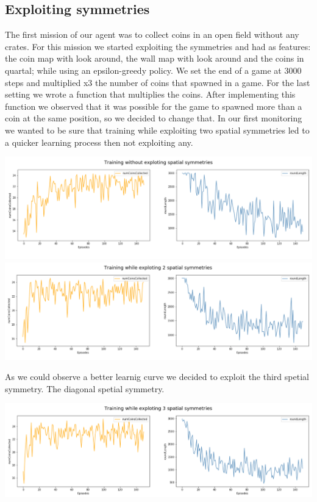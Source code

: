 \subsection{Exploiting symmetries}
The first mission of our agent was to collect coins in an open field without any crates. For this mission we started exploiting the symmetries and had as features: the coin map with look around, the wall map with look around and the coins in quartal; while using an epsilon-greedy policy. We set the end of a game at 3000 steps and multiplied x3 the number of coins that spawned in a game. For the last setting we wrote a function that multiplies the coins. After implementing this function we observed that it was possible for the game to spawned more than a coin at the same position, so we decided to change that. In our first monitoring we wanted to be sure that training while exploiting two spatial symmetries led to a quicker learning process then not exploiting any.
\begin{center}
\includegraphics[scale=0.22]{graphics/plot01.png}
\includegraphics[scale=0.22]{graphics/plot02.png}
\end{center}
As we could observe a better learnig curve we decided to exploit the third spetial symmetry. The diagonal spetial symmetry. 
\begin{center}
\includegraphics[scale=0.22]{graphics/plot03.png}
\end{center}

